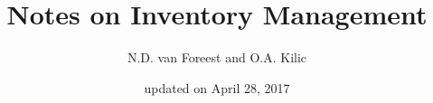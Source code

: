 \documentclass[a4paper,11pt]{scrartcl}
\title{Notes on Inventory Management}
\date{\small updated on April 28, 2017}
\author{\small N.D. van Foreest and O.A. Kilic}
\begin{document}
\maketitle
{\small \tableofcontents}

\newpage 




%
%
\end{document}
